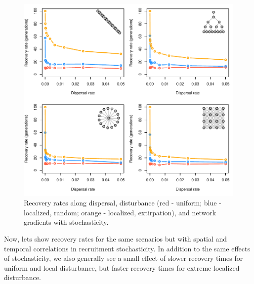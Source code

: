 \documentclass[
]{article}
\begin{document}
\begin{figure}[H]

{\centering \includegraphics{Managing_for_ecological_surprises_in_metapopulations_files/figure-latex/stochastic recruitment-1} 

}

\caption{Recovery rates along dispersal, disturbance (red - uniform; blue - localized, random; orange - localized, extirpation), and network gradients with stochasticity.}\label{fig:stochastic recruitment}
\end{figure}
\newpage

Now, lets show recovery rates for the same scenarios but with spatial
and temporal correlations in recruitment stochasticity. In addition to
the same effects of stochasticity, we also generally see a small effect
of slower recovery times for uniform and local disturbance, but faster
recovery times for extreme localized disturbance.
\end{document}
